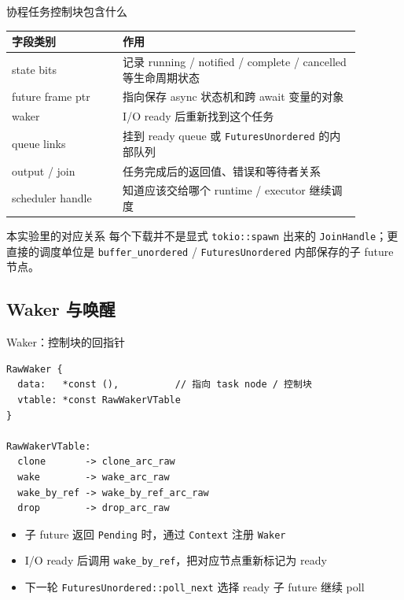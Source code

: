 \documentclass[aspectratio=169,11pt]{beamer}
\begin{document}
\begin{frame}{协程任务控制块包含什么}
  \small
  \begin{tabular}{>{\ttfamily}p{0.28\linewidth}p{0.60\linewidth}}
    \toprule
    字段类别 & 作用 \\
    \midrule
    state bits & 记录 running / notified / complete / cancelled 等生命周期状态 \\
    future frame ptr & 指向保存 async 状态机和跨 await 变量的对象 \\
    waker & I/O ready 后重新找到这个任务 \\
    queue links & 挂到 ready queue 或 \texttt{FuturesUnordered} 的内部队列 \\
    output / join & 任务完成后的返回值、错误和等待者关系 \\
    scheduler handle & 知道应该交给哪个 runtime / executor 继续调度 \\
    \bottomrule
  \end{tabular}

  \vspace{0.4em}
  \begin{block}{本实验里的对应关系}
    每个下载并不是显式 \texttt{tokio::spawn} 出来的 \texttt{JoinHandle}；更直接的调度单位是 \texttt{buffer\_unordered} / \texttt{FuturesUnordered} 内部保存的子 future 节点。
  \end{block}
\end{frame}

\subsection{Waker 与唤醒}

\begin{frame}[fragile]{Waker：控制块的回指针}
  \begin{lstlisting}
RawWaker {
  data:   *const (),          // 指向 task node / 控制块
  vtable: *const RawWakerVTable
}

RawWakerVTable:
  clone       -> clone_arc_raw
  wake        -> wake_arc_raw
  wake_by_ref -> wake_by_ref_arc_raw
  drop        -> drop_arc_raw
  \end{lstlisting}

  \vspace{0.4em}
  \begin{itemize}
    \item 子 future 返回 \texttt{Pending} 时，通过 \texttt{Context} 注册 \texttt{Waker}
    \item I/O ready 后调用 \texttt{wake\_by\_ref}，把对应节点重新标记为 ready
    \item 下一轮 \texttt{FuturesUnordered::poll\_next} 选择 ready 子 future 继续 poll
  \end{itemize}
\end{frame}
\end{document}

